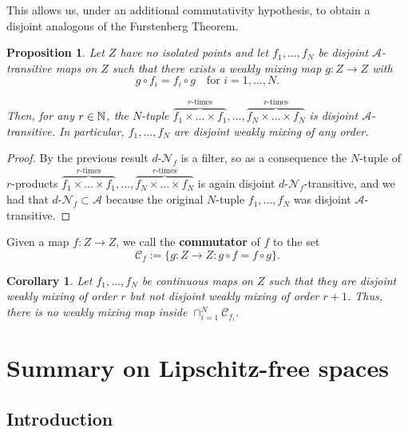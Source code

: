 \documentclass[11pt,reqno]{article}
\newtheorem{proposition}[statement]{Proposition}
\newtheorem{corollary}[statement]{Corollary}
\def\dret{d\text{-}\ret}
\def\ret{\mathcal{N}}
\def\NN{\Bbb N}
\begin{document}
This allows us, under an additional commutativity hypothesis, to obtain a disjoint analogous of the Furstenberg Theorem. 
\begin{proposition}\label{prop:comm-trans}
     Let $Z$ have no isolated points and let $f_1,...,f_N$ be disjoint $\mathcal{A}$-transitive maps on $Z$ such that there exists a weakly mixing map $g\colon Z\to Z$ with
     \[g\circ f_i = f_i \circ g \quad \text{for } i=1,...,N.\]
     
     Then, for any $r\in \NN$, the $N$-tuple $ \overbrace{f_1\times...\times f_1}^{r\text{-times}},...,\overbrace{f_N\times...\times f_N}^{r\text{-times}}$ is disjoint $\mathcal{A}$-transitive. In particular, $f_1,...,f_N$ are disjoint weakly mixing of any order.
\end{proposition}

\begin{proof}
    By the previous result $\dret_f$ is a filter, so as a consequence the $N$-tuple of $r$-products $ \overbrace{f_1\times...\times f_1}^{r\text{-times}},...,\overbrace{f_N\times...\times f_N}^{r\text{-times}}$ is again disjoint $\dret_f$-transitive, and we had that $\dret_f\subset \mathcal{A}$ because the original $N$-tuple $f_1,...,f_N$ was disjoint  $\mathcal{A}$-transitive. 
\end{proof}

Given a map $f\colon Z \to Z$, we call the \textbf{commutator} of $f$ to the set
\[ \mathcal{C}_f:=\{g\colon Z\to Z: g\circ f = f\circ g\}. \]


\begin{corollary}
    Let $f_1,...,f_N$ be continuous maps on $Z$ such that they are disjoint weakly mixing of order $r$ but not disjoint weakly mixing of order $r+1$. Thus, there is no weakly mixing map inside $\cap_{i=1}^N \mathcal{C}_{f_i}$.
\end{corollary}






\section{Summary on Lipschitz-free spaces} \label{sec:free-prel}

\subsection{Introduction}
\end{document}
